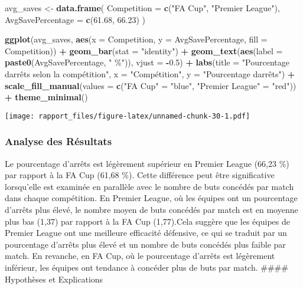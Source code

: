 \documentclass[
]{article}
\newenvironment{Shaded}{\begin{snugshade}}{\end{snugshade}}
\newcommand{\AttributeTok}[1]{\textcolor[rgb]{0.13,0.29,0.53}{#1}}
\newcommand{\FloatTok}[1]{\textcolor[rgb]{0.00,0.00,0.81}{#1}}
\newcommand{\FunctionTok}[1]{\textcolor[rgb]{0.13,0.29,0.53}{\textbf{#1}}}
\newcommand{\NormalTok}[1]{#1}
\newcommand{\OtherTok}[1]{\textcolor[rgb]{0.56,0.35,0.01}{#1}}
\newcommand{\SpecialCharTok}[1]{\textcolor[rgb]{0.81,0.36,0.00}{\textbf{#1}}}
\newcommand{\StringTok}[1]{\textcolor[rgb]{0.31,0.60,0.02}{#1}}
\begin{document}
\begin{Shaded}
\begin{Highlighting}[]
\NormalTok{avg\_saves }\OtherTok{\textless{}{-}} \FunctionTok{data.frame}\NormalTok{(}
  \AttributeTok{Competition =} \FunctionTok{c}\NormalTok{(}\StringTok{"FA Cup"}\NormalTok{, }\StringTok{"Premier League"}\NormalTok{),}
  \AttributeTok{AvgSavePercentage =} \FunctionTok{c}\NormalTok{(}\FloatTok{61.68}\NormalTok{, }\FloatTok{66.23}\NormalTok{)}
\NormalTok{)}

\FunctionTok{ggplot}\NormalTok{(avg\_saves, }\FunctionTok{aes}\NormalTok{(}\AttributeTok{x =}\NormalTok{ Competition, }\AttributeTok{y =}\NormalTok{ AvgSavePercentage, }\AttributeTok{fill =}\NormalTok{ Competition)) }\SpecialCharTok{+}
  \FunctionTok{geom\_bar}\NormalTok{(}\AttributeTok{stat =} \StringTok{"identity"}\NormalTok{) }\SpecialCharTok{+}
  \FunctionTok{geom\_text}\NormalTok{(}\FunctionTok{aes}\NormalTok{(}\AttributeTok{label =} \FunctionTok{paste0}\NormalTok{(AvgSavePercentage, }\StringTok{" \%"}\NormalTok{)), }\AttributeTok{vjust =} \SpecialCharTok{{-}}\FloatTok{0.5}\NormalTok{) }\SpecialCharTok{+}
  \FunctionTok{labs}\NormalTok{(}\AttributeTok{title =} \StringTok{"Pourcentage d\textquotesingle{}arrêts selon la compétition"}\NormalTok{,}
       \AttributeTok{x =} \StringTok{"Compétition"}\NormalTok{, }\AttributeTok{y =} \StringTok{"Pourcentage d\textquotesingle{}arrêts"}\NormalTok{) }\SpecialCharTok{+}
  \FunctionTok{scale\_fill\_manual}\NormalTok{(}\AttributeTok{values =} \FunctionTok{c}\NormalTok{(}\StringTok{"FA Cup"} \OtherTok{=} \StringTok{"blue"}\NormalTok{, }\StringTok{"Premier League"} \OtherTok{=} \StringTok{"red"}\NormalTok{)) }\SpecialCharTok{+}
  \FunctionTok{theme\_minimal}\NormalTok{()}
\end{Highlighting}
\end{Shaded}

\texttt{[image: rapport\_files/figure-latex/unnamed-chunk-30-1.pdf]}

\subsubsection{Analyse des Résultats}\label{analyse-des-ruxe9sultats-1}

Le pourcentage d'arrêts est légèrement supérieur en Premier League
(66,23 \%) par rapport à la FA Cup (61,68 \%). Cette différence peut
être significative lorsqu'elle est examinée en parallèle avec le nombre
de buts concédés par match dans chaque compétition. En Premier League,
où les équipes ont un pourcentage d'arrêts plus élevé, le nombre moyen
de buts concédés par match est en moyenne plus bas (1,37) par rapport à
la FA Cup (1,77).Cela suggère que les équipes de Premier League ont une
meilleure efficacité défensive, ce qui se traduit par un pourcentage
d'arrêts plus élevé et un nombre de buts concédés plus faible par match.
En revanche, en FA Cup, où le pourcentage d'arrêts est légèrement
inférieur, les équipes ont tendance à concéder plus de buts par match.
\#\#\#\# Hypothèses et Explications
\end{document}
